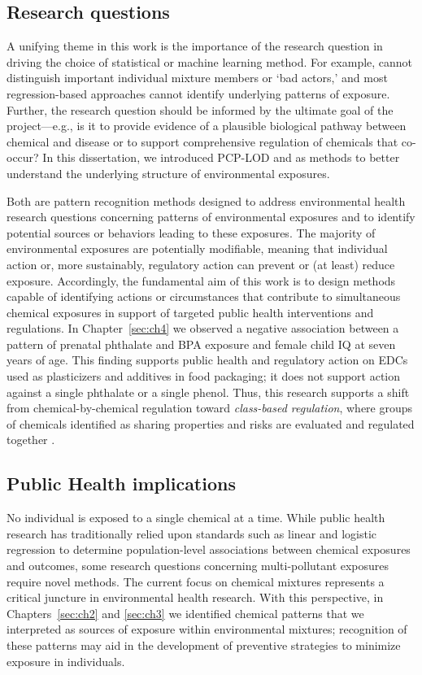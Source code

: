 \subsection{Research questions}\label{sec:question}
A unifying theme in this work is the importance of the research question in driving the choice of statistical or machine learning method. For example, \bnmf cannot distinguish important individual mixture members or `bad actors,' and most regression-based approaches cannot identify underlying patterns of exposure. Further, the research question should be informed by the ultimate goal of the project---e.g., is it to provide evidence of a plausible biological pathway between chemical and disease or to support comprehensive regulation of chemicals that co-occur? In this dissertation, we introduced PCP-LOD and \bnmf as methods to better understand the underlying structure of environmental exposures.

Both are pattern recognition methods designed to address environmental health research questions concerning patterns of environmental exposures and to identify potential sources or behaviors leading to these exposures. The majority of environmental exposures are potentially modifiable, meaning that individual action or, more sustainably, regulatory action can prevent or (at least) reduce exposure. Accordingly, the fundamental aim of this work is to design methods capable of identifying actions or circumstances that contribute to simultaneous chemical exposures in support of targeted public health interventions and regulations. In Chapter~\ref{sec:ch4} we observed a negative association between a pattern of prenatal phthalate and BPA exposure and female child IQ at seven years of age. This finding supports public health and regulatory action on EDCs used as plasticizers and additives in food packaging; it does not support action against a single phthalate or a single phenol. Thus, this research supports a shift from chemical-by-chemical regulation toward \textit{class-based regulation}, where groups of chemicals identified as sharing properties and risks are evaluated and regulated together \citep{cordner2016can}.

\subsection{Public Health implications}\label{sec:fin}
No individual is exposed to a single chemical at a time. While public health research has traditionally relied upon standards such as linear and logistic regression to determine population-level associations between chemical exposures and outcomes, some research questions concerning multi-pollutant exposures require novel methods. The current focus on chemical mixtures represents a critical juncture in environmental health research. With this perspective, in Chapters~\ref{sec:ch2} and \ref{sec:ch3} we identified chemical patterns that we interpreted as sources of exposure within environmental mixtures; recognition of these patterns may aid in the development of preventive strategies to minimize exposure in individuals.

